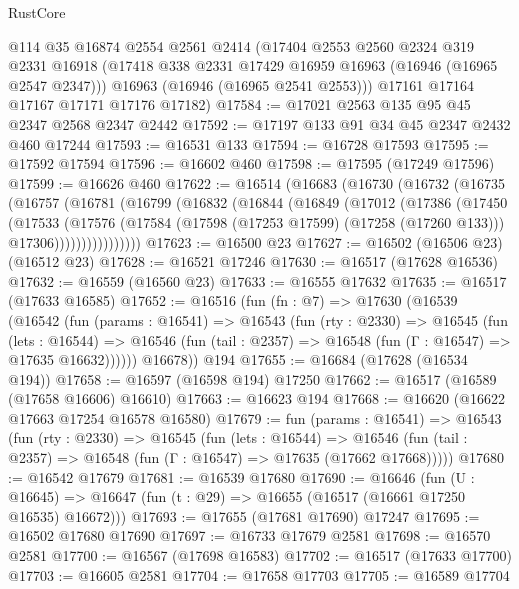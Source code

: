 \begin{lexlean}{RustCore}
\begin{coremodule}
      @114
      @35
      @16874
      @2554
      @2561
      @2414
      (@17404
        @2553
        @2560
        @2324
        @319
        @2331
        @16918
        (@17418 @338 @2331 @17429 @16959 @16963 (@16946 (@16965 @2547 @2347)))
        @16963
        (@16946 (@16965 @2541 @2553)))
      @17161
      @17164
      @17167
      @17171
      @17176
      @17182)
@17584 := @17021 @2563 @135 @95 @45 @2347 @2568 @2347 @2442
@17592 := @17197 @133 @91 @34 @45 @2347 @2432 @460 @17244
@17593 := @16531 @133
@17594 := @16728 @17593
@17595 := @17592 @17594
@17596 := @16602 @460
@17598 := @17595 (@17249 @17596)
@17599 := @16626 @460
@17622 := @16514
    (@16683
      (@16730
        (@16732
          (@16735
            (@16757
              (@16781
                (@16799
                  (@16832
                    (@16844
                      (@16849
                        (@17012
                          (@17386
                            (@17450
                              (@17533
                                (@17576
                                  (@17584
                                    (@17598 (@17253 @17599) (@17258 (@17260 @133)))
                                    @17306))))))))))))))))
@17623 := @16500 @23
@17627 := @16502 (@16506 @23) (@16512 @23)
@17628 := @16521 @17246
@17630 := @16517 (@17628 @16536)
@17632 := @16559 (@16560 @23)
@17633 := @16555 @17632
@17635 := @16517 (@17633 @16585)
@17652 := @16516
    (fun (fn : @7) =>
    @17630
      (@16539
        (@16542
          (fun (params : @16541) =>
          @16543
            (fun (rty : @2330) =>
            @16545
              (fun (lets : @16544) =>
              @16546 (fun (tail : @2357) => @16548 (fun (Γ : @16547) => @17635 @16632))))))
        @16678))
    @194
@17655 := @16684 (@17628 (@16534 @194))
@17658 := @16597 (@16598 @194) @17250
@17662 := @16517 (@16589 (@17658 @16606) @16610)
@17663 := @16623 @194
@17668 := @16620 (@16622 @17663 @17254 @16578 @16580)
@17679 := fun (params : @16541) =>
  @16543
    (fun (rty : @2330) =>
    @16545
      (fun (lets : @16544) =>
      @16546 (fun (tail : @2357) => @16548 (fun (Γ : @16547) => @17635 (@17662 @17668)))))
@17680 := @16542 @17679
@17681 := @16539 @17680
@17690 := @16646
    (fun (U : @16645) => @16647 (fun (t : @29) => @16655 (@16517 (@16661 @17250 @16535) @16672)))
@17693 := @17655 (@17681 @17690) @17247
@17695 := @16502 @17680 @17690
@17697 := @16733 @17679 @2581
@17698 := @16570 @2581
@17700 := @16567 (@17698 @16583)
@17702 := @16517 (@17633 @17700)
@17703 := @16605 @2581
@17704 := @17658 @17703
@17705 := @16589 @17704

\end{coremodule}
\end{lexlean}
